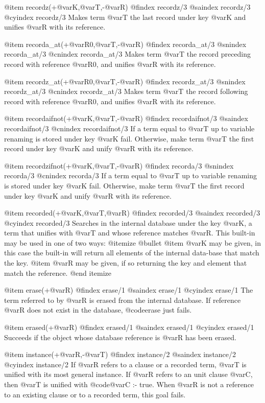 {{{{{{@item recordz(+@var{K},@var{T},-@var{R})
@findex recordz/3
@saindex recordz/3
@cyindex recordz/3
Makes term @var{T} the last record under key @var{K} and unifies @var{R}
with its reference.

@item recorda_at(+@var{R0},@var{T},-@var{R})
@findex recorda_at/3
@snindex recorda_at/3
@cnindex recorda_at/3
Makes term @var{T} the record preceding record with reference
@var{R0}, and unifies @var{R} with its reference.

@item recordz_at(+@var{R0},@var{T},-@var{R})
@findex recordz_at/3
@snindex recordz_at/3
@cnindex recordz_at/3
Makes term @var{T} the record following record with reference
@var{R0}, and unifies @var{R} with its reference.

@item recordaifnot(+@var{K},@var{T},-@var{R})
@findex recordaifnot/3
@saindex recordaifnot/3
@cnindex recordaifnot/3
If a term equal to @var{T} up to variable renaming is stored under key
@var{K} fail. Otherwise, make term @var{T} the first record under key
@var{K} and unify @var{R} with its reference.

@item recordzifnot(+@var{K},@var{T},-@var{R})
@findex recorda/3
@snindex recorda/3
@cnindex recorda/3
If a term equal to @var{T} up to variable renaming is stored under key
@var{K} fail. Otherwise, make term @var{T} the first record under key
@var{K} and unify @var{R} with its reference.

@item recorded(+@var{K},@var{T},@var{R})
@findex recorded/3
@saindex recorded/3
@cyindex recorded/3
Searches in the internal database under the key @var{K}, a term that
unifies with @var{T} and whose reference matches @var{R}. This
built-in may be used in one of two ways:
@itemize @bullet
@item @var{K} may be given, in this case the built-in will return all
elements of the internal data-base that match the key.
@item @var{R} may be given, if so returning the key and element that
match the reference.
@end itemize

@item erase(+@var{R})
@findex erase/1
@saindex erase/1
@cyindex erase/1
The term referred to by @var{R} is erased from the internal database. If
reference @var{R} does not exist in the database, @code{erase} just fails.

@item erased(+@var{R})
@findex erased/1
@saindex erased/1
@cyindex erased/1
Succeeds if the object whose database reference is @var{R} has been
erased.

@item instance(+@var{R},-@var{T})
@findex instance/2
@saindex instance/2
@cyindex instance/2
If @var{R} refers to a clause or a recorded term, @var{T} is unified
with its most general instance. If @var{R} refers to an unit clause
@var{C}, then @var{T} is unified with @code{@var{C} :- true}. When
@var{R} is not a reference to an existing clause or to a recorded term,
this goal fails.

}}}}}}
